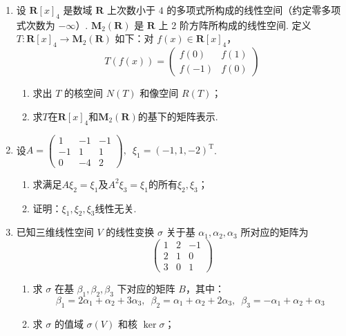\begin{enumerate}
    \item 设 $\mathbf{R}[x]_4$ 是数域 $\mathbf{R}$ 上次数小于 $4$ 的多项式所构成的线性空间（约定零多项式次数为 $-\infty$）. $\mathbf{M}_2(\mathbf{R})$ 是 $\mathbf{R}$ 上 2 阶方阵所构成的线性空间. 定义 $T : \mathbf{R}[x]_4 \to \mathbf{M}_2(\mathbf{R})$ 如下：对 $f(x) \in \mathbf{R}[x]_4$，
          \[T(f(x))=\begin{pmatrix}f(0) & f(1) \\ f(-1) & f(0)\end{pmatrix}\]
          \begin{enumerate}
              \item 求出 $T$ 的核空间 $N(T)$ 和像空间 $R(T)$；

              \item 求$T$在$\mathbf{R}[x]_4$和$\mathbf{M}_2(\mathbf{R})$的基下的矩阵表示.
          \end{enumerate}

    \item 设$A=\begin{pmatrix}
                  1 & -1 & -1 \\ -1 & 1 & 1 \\ 0 & -4 & 2
              \end{pmatrix},\enspace\xi_1=(-1,1,-2)^\mathrm{T}$.
          \begin{enumerate}
              \item 求满足$A\xi_2=\xi_1$及$A^2\xi_3=\xi_1$的所有$\xi_2,\xi_3$；

              \item 证明：$\xi_1,\xi_2,\xi_3$线性无关.
          \end{enumerate}

    \item 已知三维线性空间 $V$ 的线性变换 $\sigma$ 关于基 $\alpha_1,\alpha_2,\alpha_3$ 所对应的矩阵为
          \[\begin{pmatrix}1 & 2 & -1 \\ 2 & 1 & 0 \\ 3 & 0 & 1\end{pmatrix}\]
          \begin{enumerate}
              \item 求 $\sigma$ 在基 $\beta_1,\beta_2,\beta_3$ 下对应的矩阵 $B$，其中：
                    \[\beta_1=2\alpha_1+\alpha_2+3\alpha_3,\enspace\beta_2=\alpha_1+\alpha_2+2\alpha_3,\enspace\beta_3=-\alpha_1+\alpha_2+\alpha_3\]

              \item 求 $\sigma$ 的值域 $\sigma(V)$ 和核 $\ker \sigma$；


\end{enumerate}
\end{enumerate}
